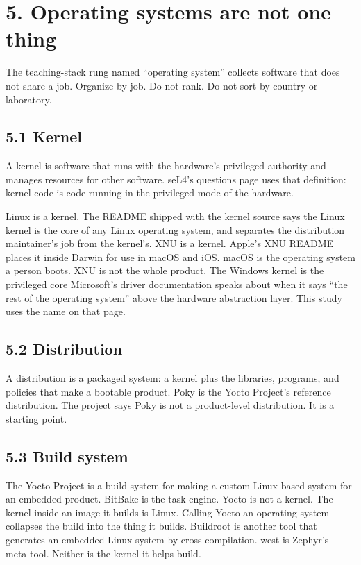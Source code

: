 \documentclass[10pt,letterpaper]{article}
\begin{document}
\section{5. Operating systems are not one
thing}\label{operating-systems-are-not-one-thing}

The teaching-stack rung named ``operating system'' collects software
that does not share a job. Organize by job. Do not rank. Do not sort by
country or laboratory.

\subsection{5.1 Kernel}\label{kernel}

A kernel is software that runs with the hardware's privileged authority
and manages resources for other software. seL4's questions page uses
that definition: kernel code is code running in the privileged mode of
the hardware.

Linux is a kernel. The README shipped with the kernel source says the
Linux kernel is the core of any Linux operating system, and separates
the distribution maintainer's job from the kernel's. XNU is a kernel.
Apple's XNU README places it inside Darwin for use in macOS and iOS.
macOS is the operating system a person boots. XNU is not the whole
product. The Windows kernel is the privileged core Microsoft's driver
documentation speaks about when it says ``the rest of the operating
system'' above the hardware abstraction layer. This study uses the name
on that page.

\subsection{5.2 Distribution}\label{distribution}

A distribution is a packaged system: a kernel plus the libraries,
programs, and policies that make a bootable product. Poky is the Yocto
Project's reference distribution. The project says Poky is not a
product-level distribution. It is a starting point.

\subsection{5.3 Build system}\label{build-system}

The Yocto Project is a build system for making a custom Linux-based
system for an embedded product. BitBake is the task engine. Yocto is not
a kernel. The kernel inside an image it builds is Linux. Calling Yocto
an operating system collapses the build into the thing it builds.
Buildroot is another tool that generates an embedded Linux system by
cross-compilation. west is Zephyr's meta-tool. Neither is the kernel it
helps build.
\end{document}
